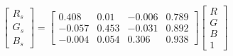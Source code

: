 \begin{equation}
\begin{bmatrix}
  R_s \\ G_s \\ B_s 
\end{bmatrix}=
\left[\begin{matrix}0.408 & 0.01 & -0.006 & 0.789\\ 
-0.057 & 0.453 & -0.031 & 0.892\\ 
-0.004 & 0.054 & 0.306 & 0.938\end{matrix}\right]
\begin{bmatrix}
  R \\ G \\ B \\ 1 
\end{bmatrix}
\end{equation}
